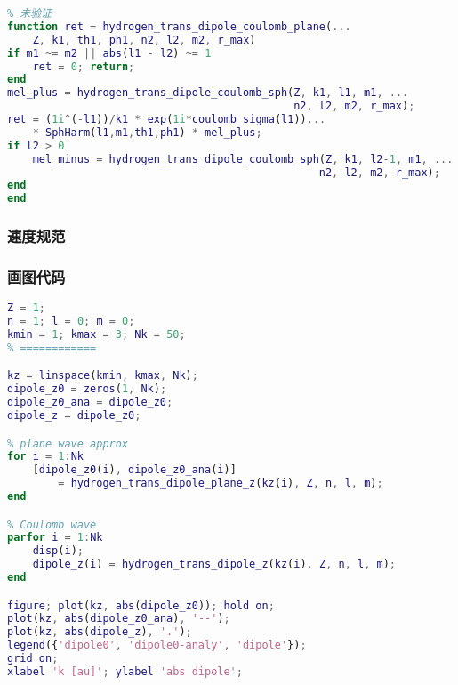 \begin{lstlisting}[language=matlab, caption=hydrogen\_trans\_dipole.m]
% <\bvec k|z|n,l,m> = eq_HyIon2_4
% 未验证
function ret = hydrogen_trans_dipole_coulomb_plane(...
    Z, k1, th1, ph1, n2, l2, m2, r_max)
if m1 ~= m2 || abs(l1 - l2) ~= 1
    ret = 0; return;
end
mel_plus = hydrogen_trans_dipole_coulomb_sph(Z, k1, l1, m1, ...
                                             n2, l2, m2, r_max);
ret = (1i^(-l1))/k1 * exp(1i*coulomb_sigma(l1))...
    * SphHarm(l1,m1,th1,ph1) * mel_plus;
if l2 > 0
    mel_minus = hydrogen_trans_dipole_coulomb_sph(Z, k1, l2-1, m1, ...
                                                 n2, l2, m2, r_max);
end
end
\end{lstlisting}

\subsubsection{速度规范}

\subsubsection{画图代码}
\begin{lstlisting}[language=matlab,caption=plot\_hydrogen\_trans\_dipole.m]
% == params ==
Z = 1;
n = 1; l = 0; m = 0;
kmin = 1; kmax = 3; Nk = 50;
% ============

kz = linspace(kmin, kmax, Nk);
dipole_z0 = zeros(1, Nk);
dipole_z0_ana = dipole_z0;
dipole_z = dipole_z0;

% plane wave approx
for i = 1:Nk
    [dipole_z0(i), dipole_z0_ana(i)]
        = hydrogen_trans_dipole_plane_z(kz(i), Z, n, l, m);
end

% Coulomb wave
parfor i = 1:Nk
    disp(i);
    dipole_z(i) = hydrogen_trans_dipole_z(kz(i), Z, n, l, m);
end

figure; plot(kz, abs(dipole_z0)); hold on;
plot(kz, abs(dipole_z0_ana), '--');
plot(kz, abs(dipole_z), '.');
legend({'dipole0', 'dipole0-analy', 'dipole'});
grid on;
xlabel 'k [au]'; ylabel 'abs dipole';
\end{lstlisting}
